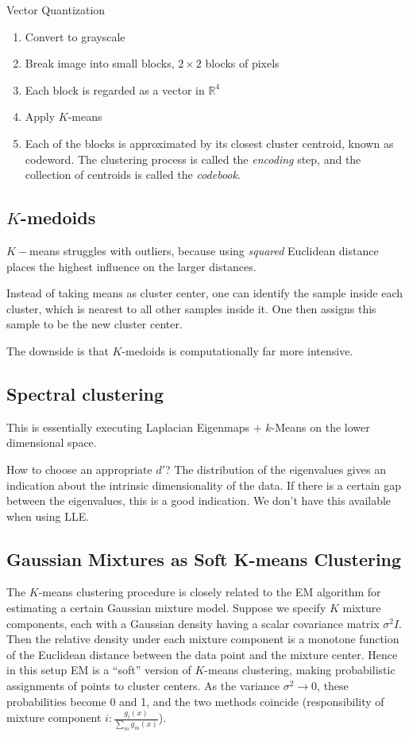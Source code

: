 \begin{algorithm}[H]
\caption{Vector Quantization}
\begin{enumerate}
    \item Convert to grayscale
    \item Break image into small blocks, \eg \(2 \times 2\) blocks of pixels
    \item Each block is regarded as a vector in \(\mathbb{R}^4\)
    \item Apply \(K\)-means
    \item Each of the blocks is approximated by its closest cluster centroid, known as codeword. The clustering process is called the \textit{encoding} step, and the collection of centroids is called the \textit{codebook}.
\end{enumerate}
\end{algorithm}

\subsection{\(K\)-medoids}
 \(K-\)means struggles with outliers, because using \textit{squared} Euclidean distance places the highest influence on the larger distances.

 Instead of taking means as cluster center, one can identify the sample inside each cluster, which is nearest to all other samples inside it. One then assigns this sample to be the new cluster center.

 The downside is that \(K\)-medoids is computationally far more intensive.

\subsection{Spectral clustering}
This is essentially executing Laplacian Eigenmaps + \(k\)-Means on the lower dimensional space.

How to choose an appropriate \(d'\)? The distribution of the eigenvalues gives an indication about the intrinsic dimensionality of the data. If there is a certain gap between the eigenvalues, this is a good indication. We don't have this available when using LLE.

\subsection{Gaussian Mixtures as Soft K-means Clustering}
The \(K\)-means clustering procedure is closely related to the EM algorithm for estimating a certain Gaussian mixture model. Suppose we specify \(K\) mixture components, each with a Gaussian density having a scalar covariance matrix \(\sigma^2 I\). Then the relative density under each mixture component is a monotone function of the Euclidean distance between the data point and the mixture center. Hence in this setup EM is a ``soft'' version of \(K\)-means clustering, making probabilistic assignments of points to cluster centers. As the variance \(\sigma^2 \rightarrow 0\), these probabilities become 0 and 1, and the two methods coincide (responsibility of mixture component \(i: \frac{g_i(x)}{\sum_m g_m(x)}\)).

